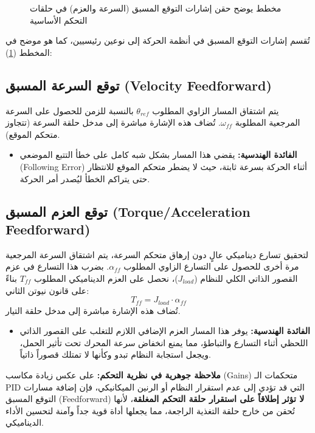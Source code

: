 \begin{figure}[h!]
{%
    }
    \caption[مخطط يوضح حقن إشارات التوقع المسبق (السرعة والعزم) في حلقات التحكم]{\centering مخطط يوضح حقن إشارات التوقع المسبق (السرعة والعزم) في حلقات التحكم الأساسية}
    \label{fig:feedforward}
\end{figure}

تُقسم إشارات التوقع المسبق في أنظمة الحركة إلى نوعين رئيسيين، كما هو موضح في المخطط (\ref{fig:feedforward}):

\subsection{توقع السرعة المسبق (\textenglish{Velocity Feedforward})}
يتم اشتقاق المسار الزاوي المطلوب $\theta_{ref}$ بالنسبة للزمن للحصول على السرعة المرجعية المطلوبة $\omega_{ff}$. تُضاف هذه الإشارة مباشرة إلى مدخل حلقة السرعة (تتجاوز متحكم الموقع). 
\begin{itemize}
    \item \textbf{الفائدة الهندسية:} يقضي هذا المسار بشكل شبه كامل على خطأ التتبع الموضعي (\textenglish{Following Error}) أثناء الحركة بسرعة ثابتة، حيث لا يضطر متحكم الموقع للانتظار حتى يتراكم الخطأ ليُصدر أمر الحركة.
\end{itemize}

\subsection{توقع العزم المسبق (\textenglish{Torque/Acceleration Feedforward})}
لتحقيق تسارع ديناميكي عالٍ دون إرهاق متحكم السرعة، يتم اشتقاق السرعة المرجعية مرة أخرى للحصول على التسارع الزاوي المطلوب $\alpha_{ff}$. بضرب هذا التسارع في عزم القصور الذاتي الكلي للنظام ($J_{load}$)، نحصل على العزم الديناميكي المطلوب $T_{ff}$ بناءً على قانون نيوتن الثاني:
$$T_{ff} = J_{load} \cdot \alpha_{ff}$$
تُضاف هذه الإشارة مباشرة إلى مدخل حلقة التيار.
\begin{itemize}
    \item \textbf{الفائدة الهندسية:} يوفر هذا المسار العزم الإضافي اللازم للتغلب على القصور الذاتي اللحظي أثناء التسارع والتباطؤ، مما يمنع انخفاض سرعة المحرك تحت تأثير الحمل، ويجعل استجابة النظام تبدو وكأنها لا تمتلك قصوراً ذاتياً.
\end{itemize}

\textbf{ملاحظة جوهرية في نظرية التحكم:} على عكس زيادة مكاسب (\textenglish{Gains}) متحكمات الـ \textenglish{PID} التي قد تؤدي إلى عدم استقرار النظام أو الرنين الميكانيكي، فإن إضافة مسارات التوقع المسبق (\textenglish{Feedforward}) \textbf{لا تؤثر إطلاقاً على استقرار حلقة التحكم المغلقة}، لأنها تُحقن من خارج حلقة التغذية الراجعة، مما يجعلها أداة قوية جداً وآمنة لتحسين الأداء الديناميكي.